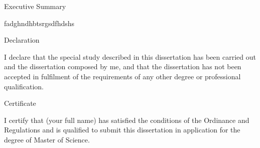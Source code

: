 \documentclass[12pt]{article}
\begin{document}
\begin{center}
{\huge Executive Summary}
\end{center}
fadghndhbtsrgsdfhdshs
\newpage

\begin{center}
{\huge Declaration}
\end{center}
I declare that the special study described in this dissertation has been carried out and the dissertation composed by me, and that the dissertation has not been accepted in fulfilment of the requirements of any other degree or professional qualification.
\newpage

\begin{center}
{\huge Certificate}
\end{center}
I certify that (your full name) has satisfied the conditions of the Ordinance and Regulations and is qualified to submit this dissertation in application for the degree of Master of Science.
\newpage
\end{document}
